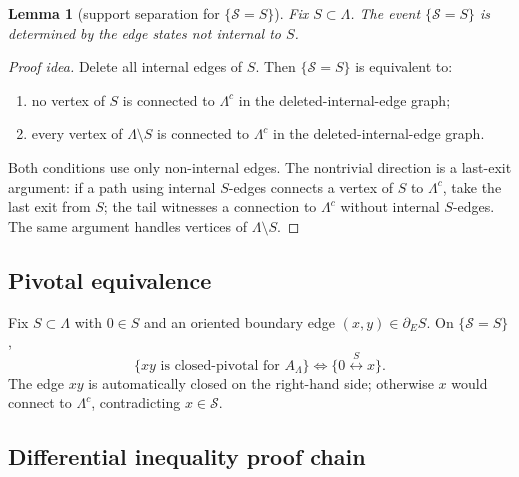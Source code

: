 \documentclass[11pt]{article}
\newcommand{\conn}{\longleftrightarrow}
\newcommand{\Lam}{\Lambda}
\newcommand{\dE}{\partial_E}
\theoremstyle{definition}
\theoremstyle{plain}
\newtheorem{lemma}[definition]{Lemma}
\begin{document}
\begin{lemma}[support separation for $\{\mathcal S=S\}$]
Fix $S\subset\Lam$.  The event $\{\mathcal S=S\}$ is determined by the edge states not internal to $S$.
\end{lemma}
\begin{proof}[Proof idea]
Delete all internal edges of $S$.  Then $\{\mathcal S=S\}$ is equivalent to:
\begin{enumerate}[label=(\alph*)]
  \item no vertex of $S$ is connected to $\Lam^c$ in the deleted-internal-edge graph;
  \item every vertex of $\Lam\setminus S$ is connected to $\Lam^c$ in the deleted-internal-edge graph.
\end{enumerate}
Both conditions use only non-internal edges.  The nontrivial direction is a last-exit argument: if a path using internal $S$-edges connects a vertex of $S$ to $\Lam^c$, take the last exit from $S$; the tail witnesses a connection to $\Lam^c$ without internal $S$-edges.  The same argument handles vertices of $\Lam\setminus S$.
\end{proof}

\subsection{Pivotal equivalence}

Fix $S\subset\Lam$ with $0\in S$ and an oriented boundary edge $(x,y)\in\dE S$.  On $\{\mathcal S=S\}$,
\[
  \{xy\text{ is closed-pivotal for }A_\Lam\}
  \iff
  \{0\stackrel S\conn x\}.
\]
The edge $xy$ is automatically closed on the right-hand side; otherwise $x$ would connect to $\Lam^c$, contradicting $x\in\mathcal S$.

\subsection{Differential inequality proof chain}
\end{document}

